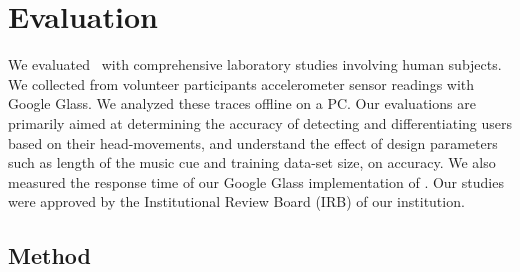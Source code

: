 \section{Evaluation}\label{sec:results}

We evaluated \systemname~with comprehensive laboratory studies involving 
human subjects. We collected from volunteer participants accelerometer sensor 
readings with Google Glass.
We analyzed these traces offline on a PC.
Our evaluations are primarily aimed at determining the accuracy of detecting 
and differentiating users based on their head-movements, and understand 
the effect of design parameters such as length of the music cue and training 
data-set size, on accuracy. We also measured the response time of our Google 
Glass implementation of \systemname.
Our studies were approved by the Institutional Review Board (IRB) of our 
institution.

\subsection{Method}

